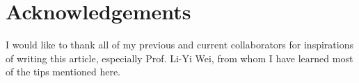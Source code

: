 \section{Acknowledgements}
I would like to thank all of my previous and current collaborators for inspirations of writing this article, especially Prof. Li-Yi Wei, from whom I have learned most of the tips mentioned here.
